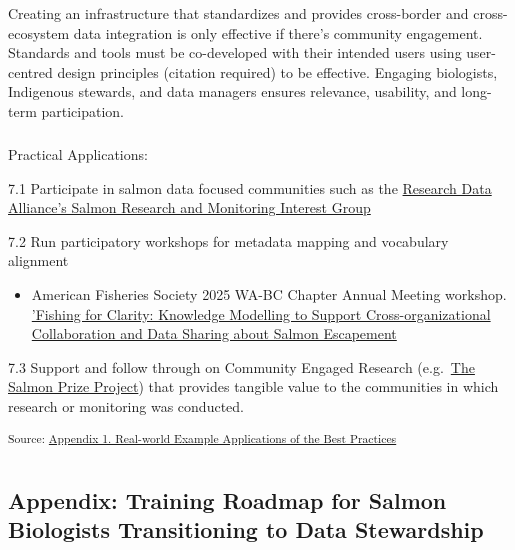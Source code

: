 \documentclass[
  letterpaper,
  DIV=11,
  numbers=noendperiod]{scrartcl}
\makeatletter
\let\oldsubparagraph\subparagraph
\renewcommand{\subparagraph}{
    \@ifstar
      \xxxSubParagraphStar
      \xxxSubParagraphNoStar
  }
\newcommand{\xxxSubParagraphStar}[1]{\oldsubparagraph*{#1}\mbox{}}
\newcommand{\xxxSubParagraphNoStar}[1]{\oldsubparagraph{#1}\mbox{}}
\providecommand{\tightlist}{%
  \setlength{\itemsep}{0pt}\setlength{\parskip}{0pt}}\usepackage{longtable,booktabs,array}
\makeatother
\begin{document}
Creating an infrastructure that standardizes and provides cross-border
and cross-ecosystem data integration is only effective if there's
community engagement. Standards and tools must be co-developed with
their intended users using user-centred design principles (citation
required) to be effective. Engaging biologists, Indigenous stewards, and
data managers ensures relevance, usability, and long-term participation.

\subparagraph{Practical Applications:}\label{practical-applications-6}

7.1 Participate in salmon data focused communities such as the
\href{https://www.rd-alliance.org/groups/salmon-research-and-monitoring-ig/}{Research
Data Alliance's Salmon Research and Monitoring Interest Group}~

7.2 Run participatory workshops for metadata mapping and vocabulary
alignment

\begin{itemize}
\tightlist
\item
  American Fisheries Society 2025 WA-BC Chapter Annual Meeting workshop.
  \href{https://pnamp.org/event/workshop-fishing-for-clarity-knowledge-modeling-to-support-cross-organizational-collaboration-and-data-sharing-about-salmon-escapement/}{'Fishing
  for Clarity: Knowledge Modelling to Support Cross-organizational
  Collaboration and Data Sharing about Salmon Escapement}
\end{itemize}

7.3 Support and follow through on Community Engaged Research
(e.g.~\href{https://salmonprize.com}{The Salmon Prize Project}) that
provides tangible value to the communities in which research or
monitoring was conducted.

\textsubscript{Source:
\href{https://br-johnson.github.io/sdm-paper/appendices/appendix-1-real-world-examples-preview.html\#db49f911-1b05-49e2-a38e-2960c283159b}{Appendix
1. Real-world Example Applications of the Best Practices}}

\section{}\label{section-1}

\subsection{Appendix: Training Roadmap for Salmon Biologists
Transitioning to Data
Stewardship}\label{appendix-training-roadmap-for-salmon-biologists-transitioning-to-data-stewardship}
\end{document}
